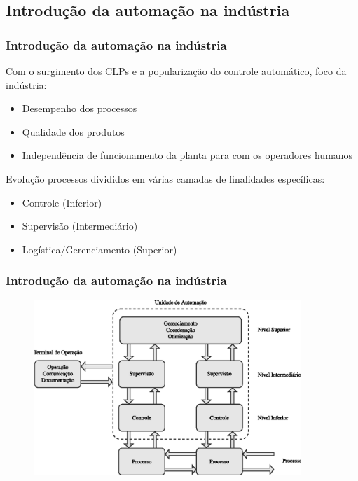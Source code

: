 \documentclass{beamer}
\begin{document}
\subsection{Introdução da automação na indústria}
\begin{frame}
    \frametitle{Introdução da automação na indústria}

    Com o surgimento dos CLPs e a popularização do controle automático, foco da
    indústria:

\begin{itemize}
    \item Desempenho dos processos
    \item Qualidade dos produtos 
    \item Independência de funcionamento da planta para com os operadores
          humanos
\end{itemize}

    Evolução \implica processos divididos em várias camadas de finalidades
    específicas:

\begin{itemize}
    \item Controle (Inferior)
    \item Supervisão (Intermediário)
    \item Logística/Gerenciamento (Superior)
\end{itemize}
    
\end{frame}

\begin{frame}
    \frametitle{Introdução da automação na indústria}

\begin{figure}[htb]
\centering
    \includegraphics[width=0.9\textwidth]{imgs/introducao/eps/esquema_automacao}
\end{figure}
\end{frame}
\end{document}
